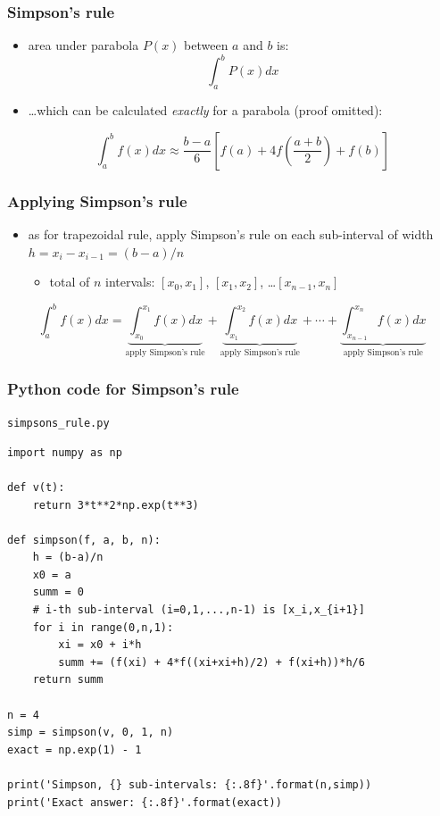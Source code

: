 \documentclass[english,14pt]{beamer}
\newcommand\blue[1]{{\color{blue} #1}}
\begin{document}
\begin{frame}[fragile]

\frametitle{Simpson's rule}

\begin{itemize}
	\item area under parabola $P(x)$ between $a$ and $b$ is:
\[
\int_a^b P(x) dx
\]
\item[] \ldots which can be calculated \emph{exactly} for a parabola (proof omitted):

\blue{
\[
\int_a^b f(x)dx \approx \frac{b-a}{6} \left[ f(a) + 4f\left(\frac{a+b}{2}\right) + f(b)\right]
\]
}

\end{itemize}

\end{frame}


\begin{frame}[fragile]

\frametitle{Applying Simpson's rule}

\begin{itemize}
\item as for trapezoidal rule, apply Simpson's rule on each sub-interval of width $h = x_i - x_{i-1} = (b-a)/n$
	\begin{itemize}
		\item total of $n$ intervals: $[x_0,x_1]$, $[x_1,x_2]$, \ldots $[x_{n-1},x_n]$
	\end{itemize}
\end{itemize}

{\small
\[
\int_a^b f(x)dx = \underbrace{\int_{x_0}^{x_1} f(x)dx}_{\text{apply Simpson's rule}} + 
\underbrace{\int_{x_1}^{x_2} f(x)dx}_{\text{apply Simpson's rule}} + \cdots + \underbrace{\int_{x_{n-1}}^{x_n} f(x)dx}_{\text{apply Simpson's rule}}
\]
}

\end{frame}


\begin{frame}[fragile]

\frametitle{Python code for Simpson's rule}
\vspace*{-2mm}
\texttt{simpsons\_rule.py}
\begin{lstlisting}[style=CStyle,basicstyle=\scriptsize]
import numpy as np

def v(t):
    return 3*t**2*np.exp(t**3)

def simpson(f, a, b, n):
    h = (b-a)/n
    x0 = a
    summ = 0
    # i-th sub-interval (i=0,1,...,n-1) is [x_i,x_{i+1}]
    for i in range(0,n,1):
        xi = x0 + i*h
        summ += (f(xi) + 4*f((xi+xi+h)/2) + f(xi+h))*h/6
    return summ

n = 4
simp = simpson(v, 0, 1, n)
exact = np.exp(1) - 1

print('Simpson, {} sub-intervals: {:.8f}'.format(n,simp))
print('Exact answer: {:.8f}'.format(exact))
\end{lstlisting}

\end{frame}
\end{document}
